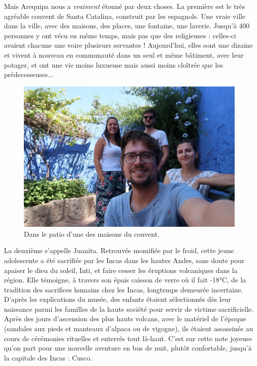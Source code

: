 Mais Arequipa nous a \emph{vraiment} étonné par deux choses. La première
est le très agréable couvent de Santa Catalina, construit par les
espagnols. Une vraie ville dans la ville, avec des maisons, des places,
une fontaine, une laverie. Jusqu'à 400 personnes y ont vécu en même
temps, mais pas que des religieuses : celles-ci avaient chacune une
voire plusieurs servantes ! Aujourd'hui, elles sont une dizaine et
vivent à nouveau en communauté dans un seul et même bâtiment, avec leur
potager, et ont une vie moins luxueuse mais aussi moins cloîtrée que les
prédecesseuses...

\begin{figure}
\centering
\includegraphics{images/20180911_catalina.JPG}
\caption{Dans le patio d'une des maisons du couvent.}
\end{figure}

La deuxième s'appelle Juanita. Retrouvée momifiée par le froid, cette
jeune adolescente a été sacrifiée par les Incas dans les hautes Andes,
sans doute pour apaiser le dieu du soleil, Inti, et faire cesser les
éruptions volcaniques dans la région. Elle témoigne, à travers son épais
caisson de verre où il fait -18°C, de la tradition des sacrifices
humains chez les Incas, longtemps demeurée incertaine. D'après les
explications du musée, des enfants étaient sélectionnés dès leur
naissance parmi les familles de la haute société pour servir de victime
sacrificielle. Après des jours d'ascension des plus hauts volcans, avec
le matériel de l'époque (sandales aux pieds et manteaux d'alpaca ou de
vigogne), ils étaient assassinés au cours de cérémonies rituelles et
enterrés tout là-haut. C'est sur cette note joyeuse qu'on part pour une
nouvelle aventure en bus de nuit, plutôt confortable, jusqu'à la
capitale des Incas : Cusco.

